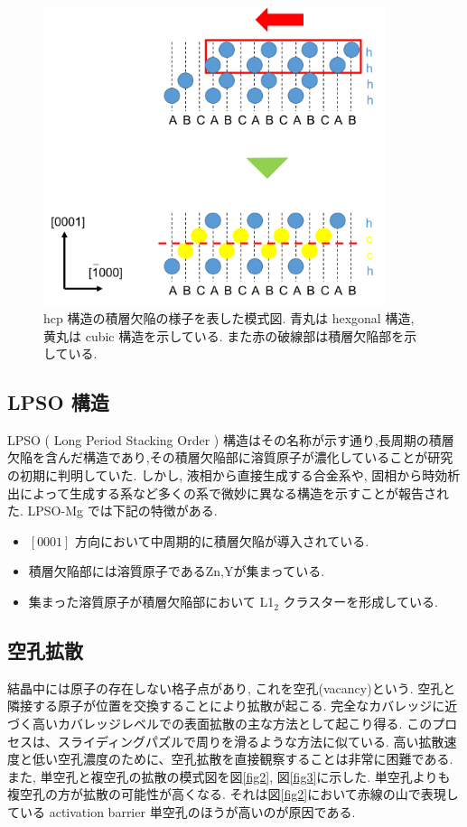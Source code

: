 \begin{figure}[htbp]
	\begin{center}
		\includegraphics[width=100mm]{../intro/stuc.png}
		\caption{hcp 構造の積層欠陥の様子を表した模式図. 青丸は hexgonal 構造, 黄丸は cubic 構造を示している. また赤の破線部は積層欠陥部を示している.}
		\label{fig1}
	\end{center}
\end{figure}

\subsection{LPSO 構造}
LPSO ( Long Period Stacking Order ) 構造はその名称が示す通り,長周期の積層欠陥を含んだ構造であり,その積層欠陥部に溶質原子が濃化していることが研究の初期に判明していた. しかし, 液相から直接生成する合金系や, 固相から時効析出によって生成する系など多くの系で微妙に異なる構造を示すことが報告された. LPSO-Mg では下記の特徴がある.

\begin{itemize}
  \item $[0001]$ 方向において中周期的に積層欠陥が導入されている.
  \item 積層欠陥部には溶質原子であるZn,Yが集まっている.
  \item 集まった溶質原子が積層欠陥部において L1$_2$ クラスターを形成している.
\end{itemize}

\subsection{空孔拡散}
結晶中には原子の存在しない格子点があり, これを空孔(vacancy)という. 空孔と隣接する原子が位置を交換することにより拡散が起こる.
完全なカバレッジに近づく高いカバレッジレベルでの表面拡散の主な方法として起こり得る. このプロセスは、スライディングパズルで周りを滑るような方法に似ている. 高い拡散速度と低い空孔濃度のために、空孔拡散を直接観察することは非常に困難である. また, 単空孔と複空孔の拡散の模式図を図\ref{fig2}, 図\ref{fig3}に示した. 単空孔よりも複空孔の方が拡散の可能性が高くなる. それは図\ref{fig2}において赤線の山で表現している activation barrier 単空孔のほうが高いのが原因である.

